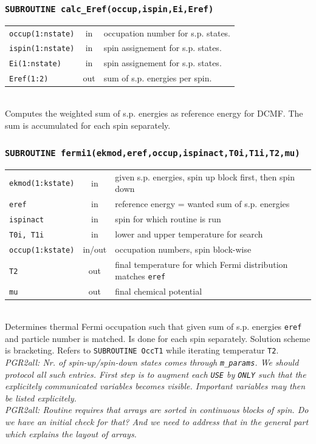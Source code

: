 \documentclass[final,1p]{elsarticle}
\newcommand{\PGRcomm}[1]{{\color{blue}\small\em PGR2all: #1}}
\begin{document}
\subsubsection*{\tt SUBROUTINE calc\_Eref(occup,ispin,Ei,Eref)}
\begin{tabular}{lcl}
 {\tt occup(1:nstate)} & in & occupation number for s.p. states.\\
 {\tt ispin(1:nstate)} & in & spin assignement for s.p. states.\\
 {\tt Ei(1:nstate)} & in & spin assignement for s.p. states.\\
 {\tt Eref(1:2)} & out & sum of s.p. energies per spin.\\
\end{tabular}
\\
Computes the weighted sum of s.p. energies as reference energy
for DCMF. The sum is accumulated for each spin separately.


\subsubsection*{\tt SUBROUTINE fermi1(ekmod,eref,occup,ispinact,T0i,T1i,T2,mu)}
\begin{tabular}{lcl}
 {\tt ekmod(1:kstate)} & in & given s.p. energies, spin up block first, then
 spin down\\
 {\tt eref}& in & reference energy = wanted sum of s.p. energies\\
 {\tt ispinact}& in & spin for which routine is run\\
 {\tt T0i, T1i}& in & lower and upper temperature for search\\
 {\tt occup(1:kstate)}& in/out & occupation numbers, spin block-wise\\
 {\tt T2} & out & final temperature for which Fermi distribution
 matches {\tt eref} \\
 {\tt mu} & out & final chemical potential\\
\end{tabular}
\\[4pt]
Determines thermal Fermi occupation such that given sum of
s.p. energies {\tt eref} and particle number is matched. Is done for
each spin separately. Solution scheme is bracketing. Refers to 
{\tt SUBROUTINE OccT1} while iterating temperatur {\tt T2}.
\\
\PGRcomm{Nr. of spin-up/spin-down states comes through {\tt m\_params}. 
We should protocol all such entries. First step is to augment each
{\tt USE} by {\tt ONLY} such that the explicitely communicated
variables becomes visible. Important variables may then be listed
explicitely.
}
\\
\PGRcomm{Routine requires that arrays are sorted in continuous blocks of
  spin. Do we have an initial check for that? And we need to address
  that in the general part which explains the layout of arrays.}
\end{document}
